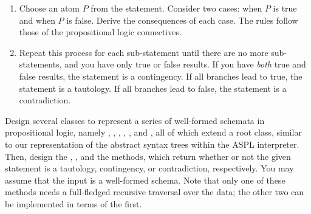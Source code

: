 
\begin{enumerate}
    \item Choose an atom $P$ from the statement. Consider two cases: when $P$ is true and when $P$ is false. Derive the consequences of each case. The rules follow those of the propositional logic connectives.
    \item Repeat this process for each sub-statement until there are no more sub-statements, and you have only true or false results. If you have \emph{both} true and false results, the statement is a contingency. If all branches lead to true, the statement is a tautology. If all branches lead to false, the statement is a contradiction. 
\end{enumerate}

Design several classes to represent a series of well-formed schemata in propositional logic, namely , , , , , and , all of which extend a root  class, similar to our representation of the abstract syntax trees within the ASPL interpreter. Then, design the , , and the  methods, which return whether or not the given statement is a tautology, contingency, or contradiction, respectively. You may assume that the input is a well-formed schema. Note that only one of these methods needs a full-fledged recursive traversal over the data; the other two can be implemented in terms of the first.